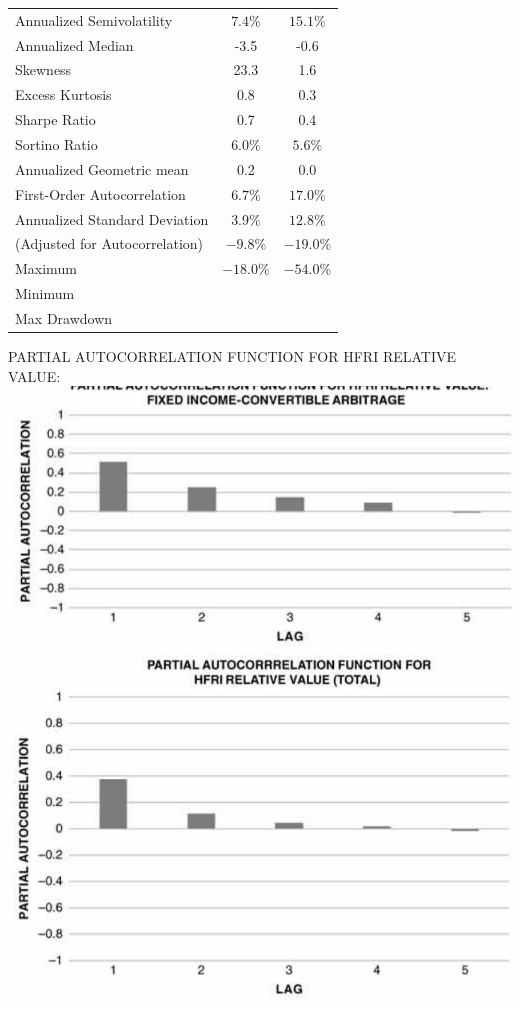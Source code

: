 \documentclass[11pt]{article}
\begin{document}
\begin{center}
\begin{tabular}{lcc}
Annualized Semivolatility & $7.4 \%$ & $15.1 \%$ \\
Annualized Median & -3.5 & -0.6 \\
Skewness & 23.3 & 1.6 \\
Excess Kurtosis & 0.8 & 0.3 \\
Sharpe Ratio & 0.7 & 0.4 \\
Sortino Ratio & $6.0 \%$ & $5.6 \%$ \\
Annualized Geometric mean & 0.2 & 0.0 \\
First-Order Autocorrelation & $6.7 \%$ & $17.0 \%$ \\
Annualized Standard Deviation & $3.9 \%$ & $12.8 \%$ \\
(Adjusted for Autocorrelation) & $-9.8 \%$ & $-19.0 \%$ \\
Maximum & $-18.0 \%$ & $-54.0 \%$ \\
Minimum &  &  \\
Max Drawdown &  &  \\
\hline
\end{tabular}
\end{center}

PARTIAL AUTOCORRELATION FUNCTION FOR HFRI RELATIVE VALUE:\\
\includegraphics[max width=\textwidth, center]{2024_04_09_d2bdb6aa136bcf7c7f5eg-09}
\end{document}
